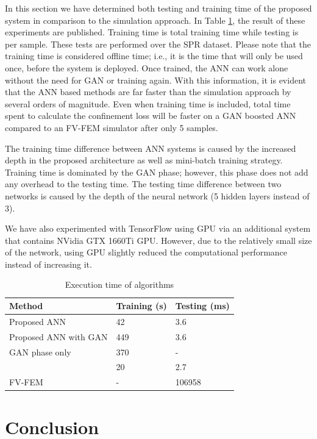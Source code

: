 \documentclass[journal]{IEEEtran}
\begin{document}
In this section we have determined both testing and training time of the proposed system in comparison to the simulation approach. In Table \ref{tbl:timing}, the result of these experiments are published. Training time is total training time while testing is per sample. These tests are performed over the SPR dataset. Please note that the training time is considered offline time; i.e., it is the time that will only be used once, before the system is deployed. Once trained, the ANN can work alone without the need for GAN or training again. With this information, it is evident that the ANN based methods are far faster than the simulation approach by several orders of magnitude. Even when training time is included, total time spent to calculate the confinement loss will be faster on a GAN boosted ANN compared to an FV-FEM simulator after only 5 samples.

The training time difference between ANN systems is caused by the increased depth in the proposed architecture as well as mini-batch training strategy. Training time is dominated by the GAN phase; however, this phase does not add any overhead to the testing time. The testing time difference between two networks is caused by the depth of the neural network (5 hidden layers instead of 3). 

We have also experimented with TensorFlow using GPU via an additional system that contains NVidia GTX 1660Ti GPU. However, due to the relatively small size of the network, using GPU slightly reduced the computational performance instead of increasing it.

\begin{table}
	\caption{Execution time of algorithms}
	\centering
	\begin{tabular}{l|l|l}
		Method    			  &  Training (s) & Testing (ms) \\\hline
		Proposed ANN 		  &  42 & 3.6 \\
		Proposed ANN with GAN & 449 & 3.6 \\
		GAN phase only        & 370 &  -  \\
		\cite{paper0}		  &  20 & 2.7 \\
		FV-FEM		   		  &  -  & 106958
	\end{tabular}
	\label{tbl:timing}
\end{table}

\section{Conclusion}
\label{sec:conc}
\end{document}
